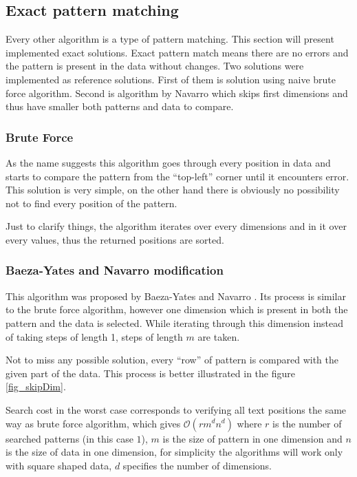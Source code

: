 \subsection{Exact pattern matching}\label{epm}
Every other algorithm is a type of pattern matching. This section will present implemented exact solutions. Exact pattern match means there are no errors and the pattern is present in the data without changes. Two solutions were implemented as reference solutions. First of them is solution using naive brute force algorithm. Second is algorithm by Navarro which skips first dimensions and thus have smaller both patterns and data to compare.

\subsubsection{Brute Force}
As the name suggests this algorithm goes through every position in data and starts to compare the pattern from the ``top-left'' corner until it encounters error. This solution is very simple, on the other hand there is obviously no possibility not to find every position of the pattern.

Just to clarify things, the algorithm iterates over every dimensions and in it over every values, thus the returned positions are sorted.

\subsubsection{Baeza-Yates and Navarro modification}
This algorithm was proposed by Baeza-Yates and Navarro \cite{mdApproxPM}. Its process is similar to the brute force algorithm, however one dimension which is present in both the pattern and the data is selected. While iterating through this dimension instead of taking steps of length 1, steps of length $m$ are taken.

Not to miss any possible solution, every ``row'' of pattern is compared with the given part of the data. This process is better illustrated in the figure \ref{fig_skipDim}.

Search cost in the worst case corresponds to verifying all text positions the same way as brute force algorithm, which gives $ \mathcal{O} (rm^dn^d)$ where $r$ is the number of searched patterns (in this case $1$), $m$ is the size of pattern in one dimension and $n$ is the size of data in one dimension, for simplicity the algorithms will work only with square shaped data, $d$ specifies the number of dimensions. \cite{mdApproxPM}

